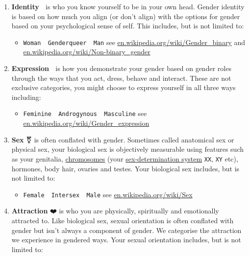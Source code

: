 \documentclass[
]{book}
\providecommand{\tightlist}{%
  \setlength{\itemsep}{0pt}\setlength{\parskip}{0pt}}
\begin{document}
\begin{enumerate}
\def\labelenumi{\arabic{enumi}.}
\tightlist
\item
  \textbf{Identity} 🧠 is who you know yourself to be in your own head. Gender identity is based on how much you align (or don't align) with the options for gender based on your psychological sense of self. This includes, but is not limited to:

  \begin{itemize}
  \tightlist
  \item
    \texttt{Woman\ \textbar{}\ Genderqueer\ \textbar{}\ Man} see \href{https://en.wikipedia.org/wiki/Gender_binary}{en.wikipedia.org/wiki/Gender\_binary} and \href{https://en.wikipedia.org/wiki/Non-binary_gender}{en.wikipedia.org/wiki/Non-binary\_gender}
  \end{itemize}
\item
  \textbf{Expression} 🎨 is how you demonstrate your gender based on gender roles through the ways that you act, dress, behave and interact. These are not exclusive categories, you might choose to express yourself in all three ways including:

  \begin{itemize}
  \tightlist
  \item
    \texttt{Feminine\ \textbar{}\ Androgynous\ \textbar{}\ Masculine} see \href{https://en.wikipedia.org/wiki/Gender_expression}{en.wikipedia.org/wiki/Gender\_expression}
  \end{itemize}
\item
  \textbf{Sex} ⚧️ is often conflated with gender. Sometimes called anatomical sex or physical sex, your biological sex is objectively measurable using features such as your genitalia, \href{https://en.wikipedia.org/wiki/Chromosome}{chromosomes} (your \href{https://en.wikipedia.org/wiki/Sex-determination_system}{sex-determination system} \texttt{XX}, \texttt{XY} etc), hormones, body hair, ovaries and testes. Your biological sex includes, but is not limited to:

  \begin{itemize}
  \tightlist
  \item
    \texttt{Female\ \textbar{}\ Intersex\ \textbar{}\ Male} see \href{https://en.wikipedia.org/wiki/Sex}{en.wikipedia.org/wiki/Sex}
  \end{itemize}
\item
  \textbf{Attraction} ❤️ is who you are physically, spiritually and emotionally attracted to. Like biological sex, sexual orientation is often conflated with gender but isn't always a component of gender. We categorise the attraction we experience in gendered ways. Your sexual orientation includes, but is not limited to:


\end{enumerate}
\end{document}
